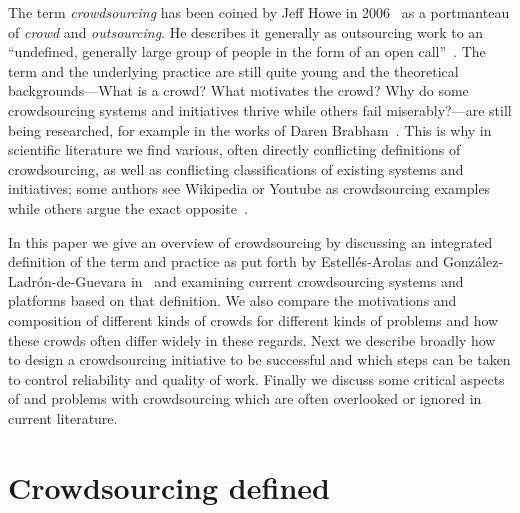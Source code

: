 \documentclass{sig-alternate}
\begin{document}
The term \emph{crowdsourcing} has been coined by Jeff Howe in
2006~\cite{howe2006rise} as a portmanteau of \emph{crowd} and
\emph{outsourcing}. He describes it generally as outsourcing work to an
``undefined, generally large group of people in the form of an open
call''~\cite{howe2009crowdsourcing}. The term and the underlying practice are
still quite young and the theoretical backgrounds---What is a crowd? What
motivates the crowd? Why do some crowdsourcing systems and initiatives thrive
while others fail miserably?---are still being researched, for example in the
works of Daren Brabham~\cite{brabham2008crowdsourcing, brabham2008moving,
	brabham2010moving}. This is why in scientific literature we find various,
often directly conflicting definitions of crowdsourcing, as well as conflicting
classifications of existing systems and initiatives; some authors see Wikipedia
or Youtube as crowdsourcing examples while others argue the exact
opposite~\cite{estelles2012towards}.

In this paper we give an overview of crowdsourcing by discussing an integrated
definition of the term and practice as put forth by Estell{\'e}s-Arolas and
Gonz{\'a}lez-Ladr{\'o}n-de-Guevara in~\cite{estelles2012towards} and examining
current crowdsourcing systems and platforms based on that definition. We also
compare the motivations and composition of different kinds of crowds for
different kinds of problems and how these crowds often differ widely in these
regards. Next we describe broadly how to design a crowdsourcing initiative to be
successful and which steps can be taken to control reliability and quality of
work. Finally we discuss some critical aspects of and problems with
crowdsourcing which are often overlooked or ignored in current literature. 


\section{Crowdsourcing defined}\label{csdef}
\end{document}
